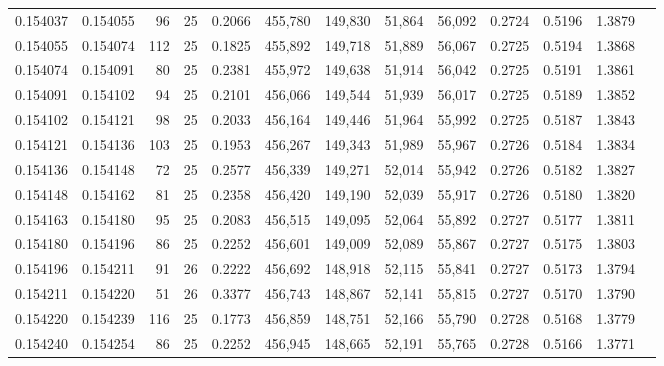\begin{tabular}{rrrrrrrrrrrrr}
0.154037 & 0.154055 &    96 &  25 &                                     0.2066 & 455,780 & 149,830 &  51,864 &  56,092 & 0.2724 & 0.5196 & 1.3879 \\
0.154055 & 0.154074 &   112 &  25 &                                     0.1825 & 455,892 & 149,718 &  51,889 &  56,067 & 0.2725 & 0.5194 & 1.3868 \\
0.154074 & 0.154091 &    80 &  25 &                                     0.2381 & 455,972 & 149,638 &  51,914 &  56,042 & 0.2725 & 0.5191 & 1.3861 \\
0.154091 & 0.154102 &    94 &  25 &                                     0.2101 & 456,066 & 149,544 &  51,939 &  56,017 & 0.2725 & 0.5189 & 1.3852 \\
0.154102 & 0.154121 &    98 &  25 &                                     0.2033 & 456,164 & 149,446 &  51,964 &  55,992 & 0.2725 & 0.5187 & 1.3843 \\
0.154121 & 0.154136 &   103 &  25 &                                     0.1953 & 456,267 & 149,343 &  51,989 &  55,967 & 0.2726 & 0.5184 & 1.3834 \\
0.154136 & 0.154148 &    72 &  25 &                                     0.2577 & 456,339 & 149,271 &  52,014 &  55,942 & 0.2726 & 0.5182 & 1.3827 \\
0.154148 & 0.154162 &    81 &  25 &                                     0.2358 & 456,420 & 149,190 &  52,039 &  55,917 & 0.2726 & 0.5180 & 1.3820 \\
0.154163 & 0.154180 &    95 &  25 &                                     0.2083 & 456,515 & 149,095 &  52,064 &  55,892 & 0.2727 & 0.5177 & 1.3811 \\
0.154180 & 0.154196 &    86 &  25 &                                     0.2252 & 456,601 & 149,009 &  52,089 &  55,867 & 0.2727 & 0.5175 & 1.3803 \\
0.154196 & 0.154211 &    91 &  26 &                                     0.2222 & 456,692 & 148,918 &  52,115 &  55,841 & 0.2727 & 0.5173 & 1.3794 \\
0.154211 & 0.154220 &    51 &  26 &                                     0.3377 & 456,743 & 148,867 &  52,141 &  55,815 & 0.2727 & 0.5170 & 1.3790 \\
0.154220 & 0.154239 &   116 &  25 &                                     0.1773 & 456,859 & 148,751 &  52,166 &  55,790 & 0.2728 & 0.5168 & 1.3779 \\
0.154240 & 0.154254 &    86 &  25 &                                     0.2252 & 456,945 & 148,665 &  52,191 &  55,765 & 0.2728 & 0.5166 & 1.3771 \\

\end{tabular}
